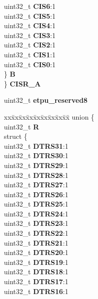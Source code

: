 \begin{DoxyCompactItemize}
\begin{tabbing}
\>\>uint32\_t {\bfseries CIS6}:1\\
\>\>uint32\_t {\bfseries CIS5}:1\\
\>\>uint32\_t {\bfseries CIS4}:1\\
\>\>uint32\_t {\bfseries CIS3}:1\\
\>\>uint32\_t {\bfseries CIS2}:1\\
\>\>uint32\_t {\bfseries CIS1}:1\\
\>\>uint32\_t {\bfseries CIS0}:1\\
\>\} {\bfseries B}\\
\} {\bfseries CISR\_A}\\

\end{tabbing}\item 
\mbox{\label{structETPU__tag_a2831a33bf6158e544327cf3bed7539aa}} 
uint32\+\_\+t {\bfseries etpu\+\_\+reserved8}
\item 
\mbox{\label{structETPU__tag_aca7313e61bbcdfc9bf989bd54c726dac}} 
\begin{tabbing}
xx\=xx\=xx\=xx\=xx\=xx\=xx\=xx\=xx\=\kill
union \{\\
\>uint32\_t {\bfseries R}\\
\>struct \{\\
\>\>uint32\_t {\bfseries DTRS31}:1\\
\>\>uint32\_t {\bfseries DTRS30}:1\\
\>\>uint32\_t {\bfseries DTRS29}:1\\
\>\>uint32\_t {\bfseries DTRS28}:1\\
\>\>uint32\_t {\bfseries DTRS27}:1\\
\>\>uint32\_t {\bfseries DTRS26}:1\\
\>\>uint32\_t {\bfseries DTRS25}:1\\
\>\>uint32\_t {\bfseries DTRS24}:1\\
\>\>uint32\_t {\bfseries DTRS23}:1\\
\>\>uint32\_t {\bfseries DTRS22}:1\\
\>\>uint32\_t {\bfseries DTRS21}:1\\
\>\>uint32\_t {\bfseries DTRS20}:1\\
\>\>uint32\_t {\bfseries DTRS19}:1\\
\>\>uint32\_t {\bfseries DTRS18}:1\\
\>\>uint32\_t {\bfseries DTRS17}:1\\
\>\>uint32\_t {\bfseries DTRS16}:1\\

\end{tabbing}
\end{DoxyCompactItemize}
